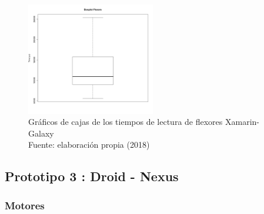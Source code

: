 \begin{figure}[H]
  \begin{center} 
   	\includegraphics[width=0.5\textwidth]{evaluation/graphics/Xamarin/Galaxy/BoxplotFlexorsXamarinGalaxy.png} 
   	\captionsetup{justification=centering}
    \caption[Gráficos de cajas de los tiempos de lectura de flexores Xamarin-Galaxy]{Gráficos de cajas de los tiempos de lectura de flexores Xamarin-Galaxy\\Fuente: elaboración propia (2018)} 
    \label{fig:xamarin-galaxy-boxplot-flexors}
  \end{center}
\end{figure}



\subsection{Prototipo 3 : Droid - Nexus}

\subsubsection{Motores}


